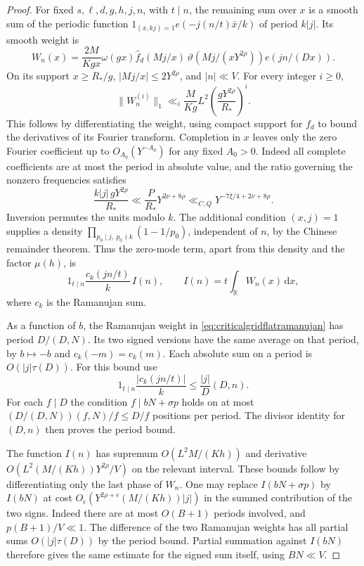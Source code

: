 \documentclass[11pt,a4paper]{article}
\numberwithin{equation}{section}
\newcommand{\ud}{\mathrm d}
\begin{document}
\begin{proof}
For fixed $s,\ell,d,g,h,j,n$, with $t\mid n$, the remaining
sum over $x$ is a smooth sum of the periodic function
$1_{(x,kj)=1}e(-j(n/t)\bar x/k)$ of period $k|j|$.
Its smooth weight is
\[
 W_n(x)=\frac{2M}{K g x}\omega(gx)
         \widehat f_d(Mj/x)\,
         \vartheta(Mj/(xY^{2\rho})) e(j n/(D x)).
\]
On its support $x\ge R_*/g$, $|Mj/x|\le2Y^{2\rho}$,
and $|n|\ll V$. For every integer $i\ge0$,
\[
 \|W_n^{(i)}\|_1\ll_i
  \frac{M}{K g}L^2 \left(\frac{gY^{2\rho}}{R_*}\right)^i.
\]
This follows by differentiating the weight, using compact
support for $f_d$ to bound the derivatives of its Fourier
transform. Completion in $x$ leaves only the zero Fourier
coefficient up to $O_{A_0}(Y^{-A_0})$ for any fixed $A_0>0$.
Indeed all complete coefficients are at most the period
in absolute value, and the ratio governing the nonzero
frequencies satisfies
\[
 \frac{k|j|\,gY^{2\rho}}{R_*}
  \ll \frac{P}{R_*}Y^{2\nu+8\rho}
  \ll_{C,Q} Y^{-7\xi/4+2\nu+8\rho}.
\]
Inversion permutes the units modulo $k$. The additional
condition $(x,j)=1$ supplies a density
$\prod_{p_0\mid j,\ p_0\nmid k}(1-1/p_0)$, independent of
$n$, by the Chinese remainder theorem. Thus the zero-mode
term, apart from this density and the factor $\mu(h)$, is
\begin{equation}
 1_{t\mid n}\frac{c_k(jn/t)}{k}\, I(n),
 \qquad I(n)=t\int_{\mathbb R} W_n(x)\,\ud x ,
 \label{eq:criticalgridflatramanujan}
\end{equation}
where $c_k$ is the Ramanujan sum.

As a function of $b$, the Ramanujan weight in
\cref{eq:criticalgridflatramanujan} has period
$D/(D,N)$. Its two signed versions have the same average
on that period, by $b\mapsto-b$ and $c_k(-m)=c_k(m)$.
Each absolute sum on a period is
$O(|j|\tau(D))$. For this bound use
\[
 1_{t\mid n}\frac{|c_k(jn/t)|}{k}
            \le \frac{|j|}{D}(D,n).
\]
For each $f\mid D$ the condition $f\mid bN+\sigma p$
holds on at most $(D/(D,N))(f,N)/f\le D/f$ positions
per period. The divisor identity for $(D,n)$ then proves
the period bound.

The function $I(n)$ has supremum
$O(L^2 M/(K h))$ and derivative
$O(L^2(M/(K h))Y^{2\rho}/V)$ on the relevant
interval. These bounds follow by differentiating only the
last phase of $W_n$. One may replace $I(bN+\sigma p)$
by $I(bN)$ at cost
$O_\epsilon(Y^{2\rho+\epsilon}(M/(K h))|j|)$ in the
summed contribution of the two signs. Indeed there are
at most $O(B+1)$ periods involved, and
$p(B+1)/V\ll 1$. The difference of the two Ramanujan
weights has all partial sums $O(|j|\tau(D))$ by
the period bound. Partial summation against $I(bN)$
therefore gives the same estimate for the signed sum
itself, using $BN\ll V$.


\end{proof}
\end{document}
